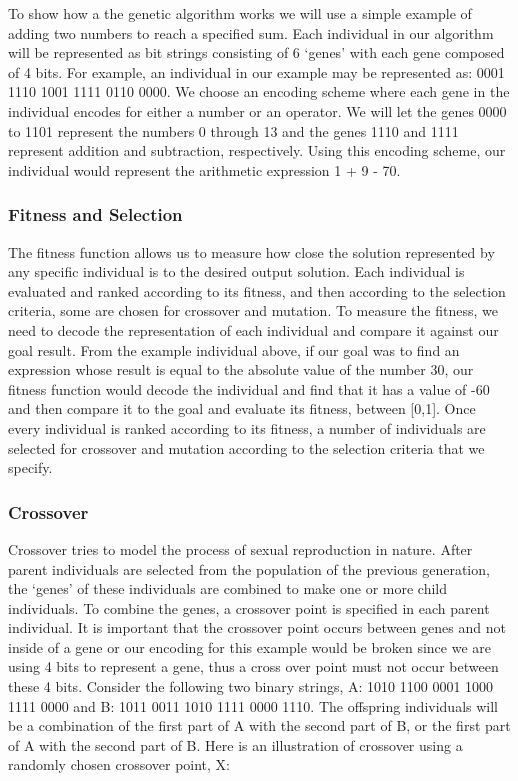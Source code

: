 To show how a the genetic algorithm works we will use a simple example of adding two numbers to reach a specified sum. 
Each individual in our algorithm will be represented as bit strings consisting of 6 `genes' with each gene composed of 4
bits. For example, an individual in our example may be represented as:  0001 1110 1001 1111 0110 0000. We choose an
encoding scheme where each gene in the individual encodes for either a number or an operator. We will let the genes 0000 to 
1101 represent the numbers 0 through 13 and the genes 1110 and 1111 represent addition and subtraction, respectively. Using 
this encoding scheme, our individual would represent the arithmetic expression 1 + 9 - 70.

\subsubsection{Fitness and Selection}
The fitness function allows us to measure how close the solution represented by any specific individual is to the desired 
output solution. Each individual is evaluated and ranked according to its fitness, and then according to the selection 
criteria, some are chosen for crossover and mutation. To measure the fitness, we need to decode the representation of each 
individual and compare it against our goal result. From the example individual above, if our goal was to find an expression 
whose result is equal to the absolute value of the number 30, our fitness function would decode the individual and find that 
it has a value of -60 and then compare it to the goal and evaluate its fitness, between [0,1]. Once every individual is ranked according 
to its fitness, a number of individuals are selected for crossover and mutation according to the selection criteria that we specify.


\subsubsection{Crossover}
Crossover tries to model the process of sexual reproduction in nature. After parent individuals are selected from the 
population of the previous generation, the `genes' of these individuals are combined to make one or more child individuals. To 
combine the genes, a crossover point is specified in each parent individual. It is important that the crossover point occurs between genes
and not inside of a gene or our encoding for this example would be broken since we are using 4 bits to represent a gene, thus a cross over point must not occur between these 4 bits. Consider the following two binary strings, A: 1010 1100 0001 1000 1111 0000 
and B: 1011 0011 1010 1111 0000 1110. The offspring individuals will be a combination of the first part of A with the second part of B, 
or the first part of A with the second part of B. Here is an illustration of crossover using a randomly chosen crossover point, X:

